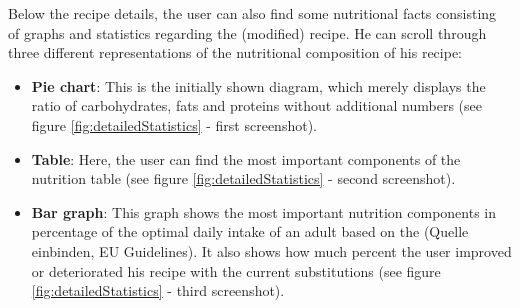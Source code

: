 Below the recipe details, the user can also find some nutritional facts consisting of graphs and statistics regarding the (modified) recipe. He can scroll through three different representations of the nutritional composition of his recipe:
\begin{itemize}
\item \textbf{Pie chart}: This is the initially shown diagram, which merely displays the ratio of carbohydrates, fats and proteins without additional numbers (see figure \ref{fig:detailedStatistics} - first screenshot).
\item \textbf{Table}: Here, the user can find the most important components of the nutrition table (see figure \ref{fig:detailedStatistics} - second screenshot).
\item \textbf{Bar graph}: This graph shows the most important nutrition components in percentage of the optimal daily intake of an adult based on the (Quelle einbinden, EU Guidelines). It also shows how much percent the user improved or deteriorated his recipe with the current substitutions (see figure \ref{fig:detailedStatistics} - third screenshot).
\end{itemize}


